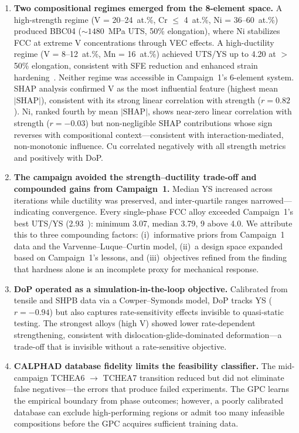 \begin{enumerate}
\item \textbf{Two compositional regimes emerged from the 8-element space.} A high-strength regime (V = 20--24~at.\%, Cr $\leq$ 4~at.\%, Ni = 36--60~at.\%) produced BBC04 (${\sim}1480$~MPa UTS, 50\% elongation), where Ni stabilizes FCC at extreme V concentrations through VEC effects. A high-ductility regime (V = 8--12~at.\%, Mn = 16~at.\%) achieved UTS/YS up to 4.20 at $>$50\% elongation, consistent with SFE reduction and enhanced strain hardening~\cite{li2016metastable, otto2013influences}. Neither regime was accessible in Campaign~1's 6-element system. SHAP analysis confirmed V as the most influential feature (highest mean $|\text{SHAP}|$), consistent with its strong linear correlation with strength ($r = 0.82$). Ni, ranked fourth by mean $|\text{SHAP}|$, shows near-zero linear correlation with strength ($r = -0.03$) but non-negligible SHAP contributions whose sign reverses with compositional context---consistent with interaction-mediated, non-monotonic influence. Cu correlated negatively with all strength metrics and positively with DoP.

\item \textbf{The campaign avoided the strength--ductility trade-off and compounded gains from Campaign~1.} Median YS increased across iterations while ductility was preserved, and inter-quartile ranges narrowed---indicating convergence. Every single-phase FCC alloy exceeded Campaign~1's best UTS/YS (2.93~\cite{hastings2025accelerated}): minimum 3.07, median 3.79, 9 above 4.0. We attribute this to three compounding factors: (i)~informative priors from Campaign~1 data and the Varvenne--Luque--Curtin model, (ii)~a design space expanded based on Campaign~1's lessons, and (iii)~objectives refined from the finding that hardness alone is an incomplete proxy for mechanical response.

\item \textbf{DoP operated as a simulation-in-the-loop objective.} Calibrated from tensile and SHPB data via a Cowper--Symonds model, DoP tracks YS ($r = -0.94$) but also captures rate-sensitivity effects invisible to quasi-static testing. The strongest alloys (high V) showed lower rate-dependent strengthening, consistent with dislocation-glide-dominated deformation---a trade-off that is invisible without a rate-sensitive objective.

\item \textbf{CALPHAD database fidelity limits the feasibility classifier.} The mid-campaign TCHEA6 $\rightarrow$ TCHEA7 transition reduced but did not eliminate false negatives---the errors that produce failed experiments. The GPC learns the empirical boundary from phase outcomes; however, a poorly calibrated database can exclude high-performing regions or admit too many infeasible compositions before the GPC acquires sufficient training data.

\end{enumerate}


